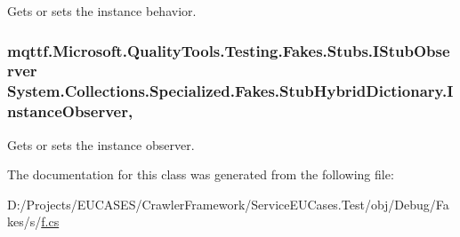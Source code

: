 Gets or sets the instance behavior.

\hypertarget{class_system_1_1_collections_1_1_specialized_1_1_fakes_1_1_stub_hybrid_dictionary_a9c91ef398c2c18a82737b3dc263a83c9}{
\subsubsection[{Instance\-Observer}]{\setlength{\rightskip}{0pt plus 5cm}mqttf.\-Microsoft.\-Quality\-Tools.\-Testing.\-Fakes.\-Stubs.\-I\-Stub\-Observer System.\-Collections.\-Specialized.\-Fakes.\-Stub\-Hybrid\-Dictionary.\-Instance\-Observer\hspace{0.3cm}{\ttfamily [get]}, {\ttfamily [set]}}}\label{class_system_1_1_collections_1_1_specialized_1_1_fakes_1_1_stub_hybrid_dictionary_a9c91ef398c2c18a82737b3dc263a83c9}


Gets or sets the instance observer.



The documentation for this class was generated from the following file\-:\begin{DoxyCompactItemize}
\item 
D\-:/\-Projects/\-E\-U\-C\-A\-S\-E\-S/\-Crawler\-Framework/\-Service\-E\-U\-Cases.\-Test/obj/\-Debug/\-Fakes/s/\hyperlink{s_2f_8cs}{f.\-cs}\end{DoxyCompactItemize}
